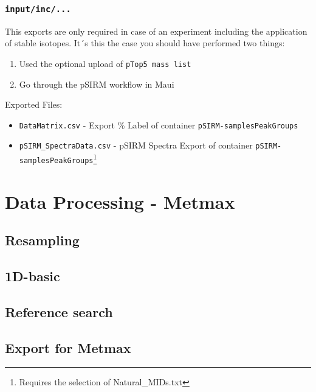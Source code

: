 \documentclass[]{book}
\providecommand{\tightlist}{%
  \setlength{\itemsep}{0pt}\setlength{\parskip}{0pt}}
\let\rmarkdownfootnote\footnote%
\def\footnote{\protect\rmarkdownfootnote}
\theoremstyle{definition}
\theoremstyle{definition}
\theoremstyle{definition}
\theoremstyle{remark}
\begin{document}
\subsection{\texorpdfstring{\texttt{input/inc/...}}{input/inc/...}}\label{inputinc...}

This exports are only required in case of an experiment including the
application of stable isotopes. It´s this the case you should have
performed two things:

\begin{enumerate}
\def\labelenumi{\arabic{enumi}.}
\tightlist
\item
  Used the optional upload of \texttt{pTop5\ mass\ list}
\item
  Go through the pSIRM workflow in Maui
\end{enumerate}

Exported Files:

\begin{itemize}
\tightlist
\item
  \texttt{DataMatrix.csv} - Export \% Label of container
  \texttt{pSIRM-samplesPeakGroups}
\item
  \texttt{pSIRM\_SpectraData.csv} - pSIRM Spectra Export of container
  \texttt{pSIRM-samplesPeakGroups}\footnote{Requires the selection of
    Natural\_MIDs.txt}
\end{itemize}

\chapter{Data Processing - Metmax}\label{metmaxexport}

\section{Resampling}\label{resampling-1}

\section{1D-basic}\label{d-basic}

\section{Reference search}\label{reference-search}

\section{Export for Metmax}\label{export-for-metmax}
\end{document}
